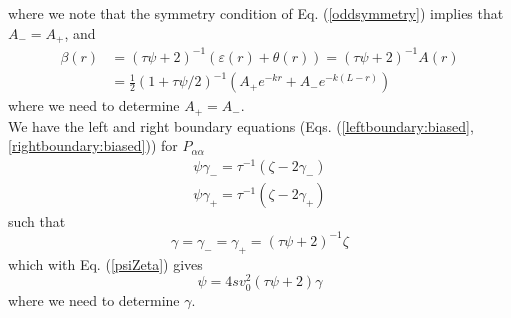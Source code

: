 \documentclass[pre,aps,superscriptaddress,nofootinbib]{revtex4}
\begin{document}
where we note that the symmetry condition of Eq. (\ref{oddsymmetry}) implies that $A_- = A_+$, and
\begin{equation}
\begin{aligned}
\beta(r) &= (\tau\psi + 2)^{-1}(\varepsilon(r) + \theta(r)) = (\tau \psi + 2)^{-1} A(r)\\
&= \frac{1}{2}(1 + \tau\psi/2)^{-1}(A_+ e^{-k r} + A_- e^{-k (L - r)})
\end{aligned}
\label{beta}
\end{equation}
where we need to determine $A_+ = A_-$.\\

We have the left and right boundary equations (Eqs. (\ref{leftboundary:biased}, \ref{rightboundary:biased})) for $P_{\alpha\alpha}$
\begin{eqnarray}
\psi \gamma_- = \tau^{-1} (\zeta - 2 \gamma_-)\\
\psi \gamma_+ = \tau^{-1} (\zeta - 2 \gamma_+)
\end{eqnarray}
such that
\begin{equation}
\gamma = \gamma_- = \gamma_+ = (\tau \psi + 2)^{-1} \zeta
\end{equation}
which with Eq. (\ref{psiZeta}) gives
\begin{equation}
\psi = 4 s v_0^2 (\tau \psi + 2) \gamma
\label{gammaPsi}
\end{equation}
where we need to determine $\gamma$.\\
\end{document}
